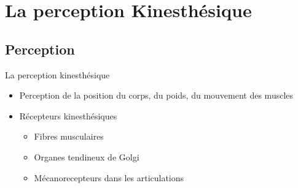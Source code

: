\documentclass[compress, noflama]{beamer}
\begin{document}
%
%

\section{La perception Kinesthésique}
\subsection{Perception}
\begin{frame}{La perception kinesthésique}

\begin{itemize}
\item Perception de la position du corps, du poids, du mouvement des muscles
\end{itemize}

\begin{itemize}
\item Récepteurs kinesthésiques
\begin{itemize}
\item Fibres musculaires
\item Organes tendineux de Golgi
\item Mécanorecepteurs dans les articulations
\end{itemize}
\end{itemize}

\end{frame}
\end{document}
